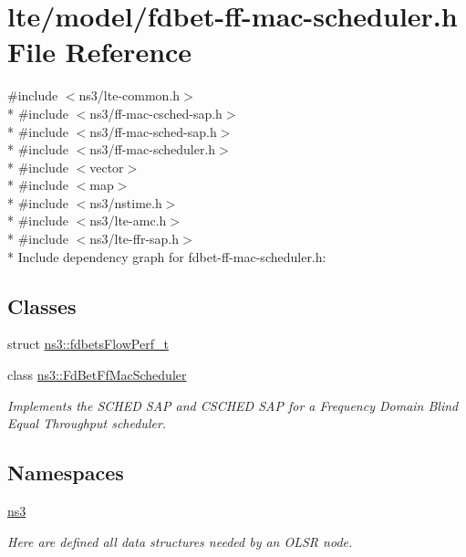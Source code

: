 \hypertarget{fdbet-ff-mac-scheduler_8h}{}\section{lte/model/fdbet-\/ff-\/mac-\/scheduler.h File Reference}
\label{fdbet-ff-mac-scheduler_8h}
{\ttfamily \#include $<$ns3/lte-\/common.\+h$>$}\\*
{\ttfamily \#include $<$ns3/ff-\/mac-\/csched-\/sap.\+h$>$}\\*
{\ttfamily \#include $<$ns3/ff-\/mac-\/sched-\/sap.\+h$>$}\\*
{\ttfamily \#include $<$ns3/ff-\/mac-\/scheduler.\+h$>$}\\*
{\ttfamily \#include $<$vector$>$}\\*
{\ttfamily \#include $<$map$>$}\\*
{\ttfamily \#include $<$ns3/nstime.\+h$>$}\\*
{\ttfamily \#include $<$ns3/lte-\/amc.\+h$>$}\\*
{\ttfamily \#include $<$ns3/lte-\/ffr-\/sap.\+h$>$}\\*
Include dependency graph for fdbet-\/ff-\/mac-\/scheduler.h\+:
\subsection*{Classes}
\begin{DoxyCompactItemize}
\item 
struct \hyperlink{structns3_1_1fdbetsFlowPerf__t}{ns3\+::fdbets\+Flow\+Perf\+\_\+t}
\item 
class \hyperlink{classns3_1_1FdBetFfMacScheduler}{ns3\+::\+Fd\+Bet\+Ff\+Mac\+Scheduler}
\begin{DoxyCompactList}\small\item\em Implements the S\+C\+H\+ED S\+AP and C\+S\+C\+H\+ED S\+AP for a Frequency Domain Blind Equal Throughput scheduler. \end{DoxyCompactList}\end{DoxyCompactItemize}
\subsection*{Namespaces}
\begin{DoxyCompactItemize}
\item 
 \hyperlink{namespacens3}{ns3}
\begin{DoxyCompactList}\small\item\em Here are defined all data structures needed by an O\+L\+SR node. \end{DoxyCompactList}\end{DoxyCompactItemize}
